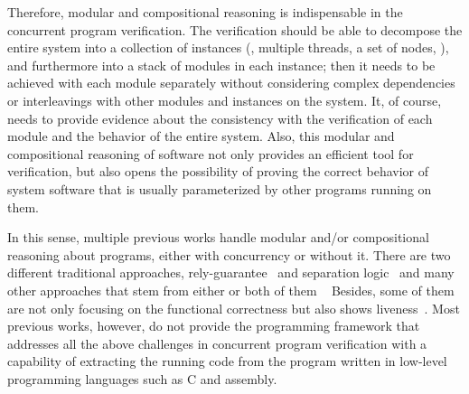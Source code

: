
Therefore, modular and compositional reasoning is indispensable in
the concurrent program verification.
The verification 
should be able to decompose the entire system 
into a collection of instances (\ie, multiple threads, a set of nodes, \etc), and furthermore into a stack of modules in each instance;
then it needs to be achieved with each module separately without considering 
complex dependencies or interleavings with other modules and instances on the system. 
It, of course, needs to provide evidence about the consistency with the verification of each module and the behavior of the entire system. 
% 
Also, 
this modular and compositional reasoning of software not only
provides an efficient tool for verification,
but also opens the possibility of 
proving the correct behavior of system software that is
usually parameterized by other programs running on them. 
%

In this sense, 
multiple previous works handle modular and/or compositional reasoning about programs,
either with concurrency or without it. 
There are two different traditional approaches,
rely-guarantee~\cite{jones83} and separation logic~\cite{ishtiaq01} 
and many other approaches that stem from either or both of them
~\cite{feng07:sagl,vafeiadis:marriage,LRG,fu10:roch,sergey15, lili16,Vafeiadis11mfps, Yang07relsep,
Liang14lics}
Besides, some of them are not only focusing on the functional correctness but also 
shows liveness~\cite{lili16}.
Most previous works, however, do not provide the programming framework that addresses all the above challenges in concurrent program verification with a capability of extracting the running code from the program written in low-level programming languages such
as C and assembly. 

